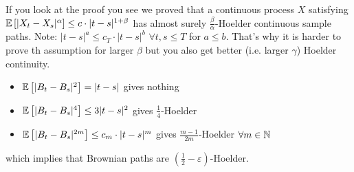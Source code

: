 \begin{bem1}
	If you look at the proof you see we proved that a continuous process $X$ satisfying $\mathbb{E}\left[ \lvert X_t - X_s \rvert^{\alpha}\right] \leq c\cdot \lvert t-s \rvert^{1+\beta}$ has almost surely $\frac{\beta}{\alpha}$-Hoelder continuous sample paths. Note: $\lvert t- s \rvert^a \leq c_T \cdot \lvert t - s \rvert^b$ $\forall t,s \leq T$ for $a\leq b$. That's why it is harder to prove th assumption for larger $\beta$ but you also get better (i.e. larger $\gamma$) Hoelder continuity.
\end{bem1}
\begin{example1}
	\begin{itemize}
		\item $\mathbb{E} \left[ \lvert B_t - B_s \rvert^2\right] =  \lvert t-s \rvert$ gives nothing
		\item $\mathbb{E} \left[ \lvert B_t - B_s \rvert^4\right] \leq 3 \lvert t-s \rvert^2$ gives $\frac{1}{4}$-Hoelder
		\item $\mathbb{E} \left[ \lvert B_t - B_s \rvert^{2m}\right] \leq c_m \cdot \lvert t-s \rvert^m$ gives $\frac{m-1}{2m}$-Hoelder $\forall m\in\mathbb{N}$
	\end{itemize}
	which implies that Brownian paths are $\left(\frac{1}{2}-\varepsilon\right)$-Hoelder.
\end{example1}
